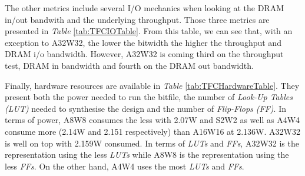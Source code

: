 
The other metrics include several I/O mechanics when looking at the DRAM in/out bandwith and the underlying throughput. Those three metrics are presented in \emph{Table} \ref{tab:TFCIOTable}. From this table, we can see that, with an exception to A32W32, the lower the bitwidth the higher the throughput and DRAM i/o bandwidth. However, A32W32 is coming third on the throughput test, DRAM in bandwidth and fourth on the DRAM out bandwidth.

\begin{table}[!htb]
  \centering
\caption[TFC Hardware Utilisation Table]{TFC Hardware Utilisation}
\label{tab:TFCHardwareTable}
\end{table}

Finally, hardware resources are available in \emph{Table} \ref{tab:TFCHardwareTable}. They present both the power needed to run the bitfile, the number of \emph{Look-Up Tables (LUT)} needed to synthesise the design and the number of \emph{Flip-Flops (FF)}. In terms of power, A8W8 consumes the less with 2.07W and S2W2 as well as A4W4 consume more (2.14W and 2.151 respectively) than A16W16 at 2.136W. A32W32 is well on top with 2.159W consumed. In terms of \emph{LUTs} and \emph{FFs}, A32W32 is the representation using the less \emph{LUTs} while A8W8 is the representation using the less \emph{FFs}. On the other hand, A4W4 uses the most \emph{LUTs} and \emph{FFs}.

